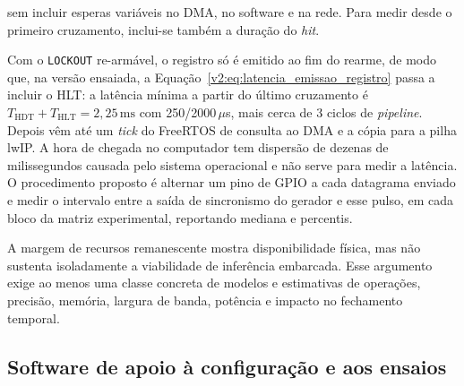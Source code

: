 \noindent
sem incluir esperas variáveis no DMA, no software e na rede. Para medir desde o primeiro cruzamento, inclui-se também a duração do \textit{hit}.

Com o \texttt{LOCKOUT} re-armável, o registro só é emitido ao fim do rearme, de modo que, na versão ensaiada, a Equação~\eqref{v2:eq:latencia_emissao_registro} passa a incluir o HLT: a latência mínima a partir do último cruzamento é \(T_{\mathrm{HDT}} + T_{\mathrm{HLT}} = 2{,}25\,\mathrm{ms}\) com 250/2000\,\(\mu\)s, mais cerca de 3 ciclos de \textit{pipeline}. Depois vêm até um \textit{tick} do FreeRTOS de consulta ao DMA e a cópia para a pilha lwIP. A hora de chegada no computador tem dispersão de dezenas de milissegundos causada pelo sistema operacional e não serve para medir a latência. O procedimento proposto é alternar um pino de GPIO a cada datagrama enviado e medir o intervalo entre a saída de sincronismo do gerador e esse pulso, em cada bloco da matriz experimental, reportando mediana e percentis.


A margem de recursos remanescente mostra disponibilidade física, mas não sustenta isoladamente a viabilidade de inferência embarcada. Esse argumento exige ao menos uma classe concreta de modelos e estimativas de operações, precisão, memória, largura de banda, potência e impacto no fechamento temporal.

\subsection{Software de apoio à configuração e aos ensaios}
\label{v2:subsec:software_apoio}

